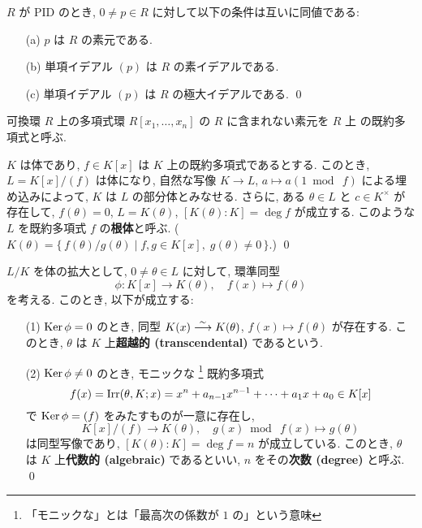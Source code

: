 \documentclass[12pt,twoside]{jarticle}
\begin{document}
\begin{question}
  $R$ が PID のとき, $0\ne p\in R$ に対して以下の条件は互いに同値である:
  \begin{itemize}
  \item[(a)] $p$ は $R$ の素元である. 
  \item[(b)] 単項イデアル $(p)$ は $R$ の素イデアルである.
  \item[(c)] 単項イデアル $(p)$ は $R$ の極大イデアルである. \qed
  \end{itemize}
\end{question}

可換環 $R$ 上の多項式環 $R[x_1,\ldots,x_n]$ の $R$ に含まれない素元を $R$ 上
の既約多項式と呼ぶ.

\begin{question}[根体]
  $K$ は体であり, $f\in K[x]$ は $K$ 上の既約多項式であるとする.
  このとき, $L=K[x]/(f)$ は体になり, 
  自然な写像 $K\to L$, $a\mapsto a (1\bmod~f)$ による埋め込みによって,
  $K$ は $L$ の部分体とみなせる.
  さらに, ある $\theta\in L$ と $c\in K^\times$ が存在して,
  $f(\theta)=0$, $L=K(\theta)$, $[K(\theta):K]=\deg f$ が成立する.
  このような $L$ を既約多項式 $f$ の{\bf 根体}と呼ぶ.
  ($K(\theta)=\{\,f(\theta)/g(\theta)\mid f,g\in K[x],\;g(\theta)\ne 0\,\}$.)
  \qed
\end{question}

\begin{question}[単拡大]
  $L/K$ を体の拡大として, $0\ne\theta\in L$ に対して, 環準同型
  \begin{equation*}
    \phi: K[x]\to K(\theta), \quad f(x)\mapsto f(\theta)
  \end{equation*}
  を考える. このとき, 以下が成立する:
  \begin{itemize}
  \item[(1)] $\mathop{\mathrm{Ker}}\nolimits\phi=0$ のとき, 
    同型 $K(x)\overset\sim\longrightarrow K(\theta)$, $f(x)\mapsto f(\theta)$ が存在する.
    このとき, $\theta$ は $K$ 上{\bf 超越的 (transcendental)} であるという.
  \item[(2)] $\mathop{\mathrm{Ker}}\nolimits\phi\ne 0$ のとき, モニックな%
    \footnote{「モニックな」とは「最高次の係数が $1$ の」という意味}%
    既約多項式
    \begin{equation*}
      f(x) = \mathop{\mathrm{Irr}}\nolimits(\theta,K;x)
      = x^n + a_{n-1}x^{n-1} + \cdots + a_1 x + a_0
      \in K[x]
    \end{equation*}
    で $\mathop{\mathrm{Ker}}\nolimits\phi=(f)$ をみたすものが一意に存在し, 
    \begin{equation*}
      K[x]/(f) \to K(\theta), \quad g(x)\bmod~f(x) \mapsto g(\theta)
    \end{equation*}
    は同型写像であり, $[K(\theta):K]=\deg f=n$ が成立している.
    このとき, $\theta$ は $K$ 上{\bf 代数的 (algebraic)} であるといい,
    $n$ をその{\bf 次数 (degree)} と呼ぶ. 
    \qed
  \end{itemize}
\end{question}
\end{document}

